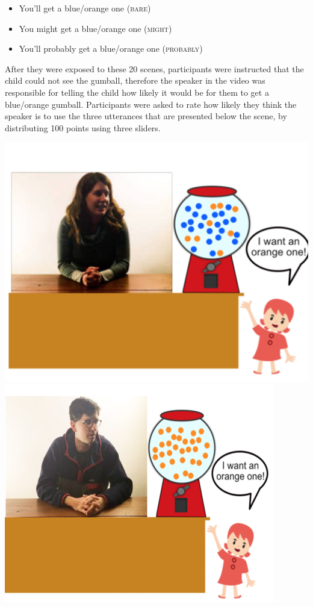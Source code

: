 \documentclass{sp}          %
\begin{document}
\begin{itemize}
\item You'll get a blue/orange one (\textsc{bare})
\item You might get a blue/orange one (\textsc{might})
\item You'll probably get a blue/orange one (\textsc{probably})
\end{itemize}

After they were exposed to these 20 scenes, participants were instructed that the child could not see the gumball, therefore the speaker in the video was responsible for telling the child how likely it would be for them to get a blue/orange gumball. Participants were asked to rate how likely they think the speaker is to use the three utterances that are presented below the scene, by distributing 100 points using three sliders.

\begin{center}
\includegraphics[scale=0.5]{female-condition.png}
\includegraphics[scale=0.55]{male-condition.png}
\end{center}
\end{document}
